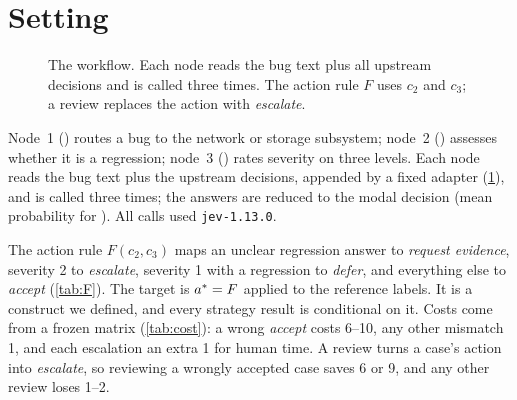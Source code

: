 \section{Setting}
\label{sec:setting}

\begin{figure}[t]
\centering
{}
\caption{The workflow. Each node reads the bug text plus all upstream
decisions and is called three times. The action rule $F$ uses $c_2$ and
$c_3$; a review replaces the action with \emph{escalate}.}
\label{fig:workflow}
\end{figure}

 Node~1 (\choice{}) routes a bug to the network or storage
subsystem; node~2 (\noul{}) assesses whether it is a regression; node~3
(\score{}) rates severity on three levels. Each node reads the bug text
plus the upstream decisions, appended by a fixed adapter
(\cref{fig:workflow}), and is called three times; the answers are reduced to the modal decision (mean
probability for \noul{}). All calls used \texttt{jev-1.13.0}.

 The action rule $F(c_2, c_3)$ maps an
unclear regression answer to \emph{request evidence}, severity 2 to
\emph{escalate}, severity 1 with a regression to \emph{defer}, and
everything else to \emph{accept} (\cref{tab:F}). The target is
$a^{*} = F$ applied to the reference labels. It is a construct we
defined, and every strategy result is conditional on it. Costs come from a
frozen matrix (\cref{tab:cost}): a wrong \emph{accept} costs 6--10, any
other mismatch 1, and each escalation an extra 1 for human time. A review
turns a case's action into \emph{escalate}, so reviewing a wrongly
accepted case saves 6 or 9, and any other review loses 1--2.

